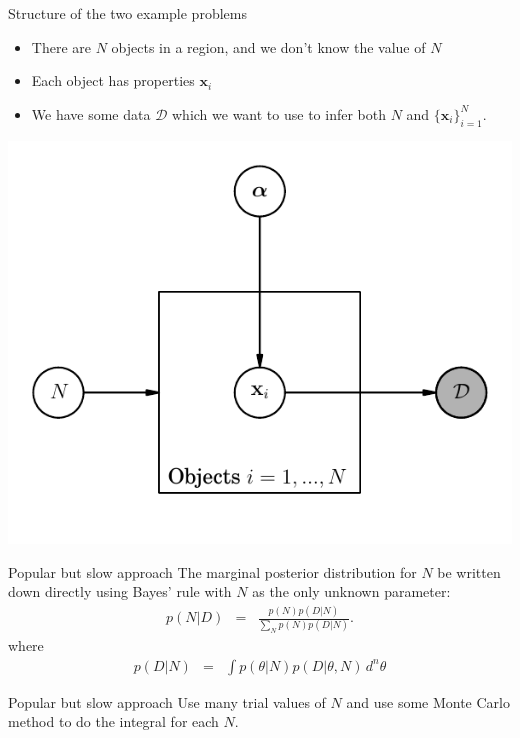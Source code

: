 \begin{frame}[t]{Structure of the two example problems}
  \begin{itemize}
  \setlength{\itemsep}{10pt}
  \item There are $N$ objects in a region, and we don't know the value of $N$
  \item Each object has properties $\mathbf{x}_i$
  \item We have some data $\mathcal{D}$ which we want to use to infer both $N$
        and $\{\mathbf{x}_i\}_{i=1}^N$.
  \end{itemize}
\begin{center}
\includegraphics[scale=0.5]{../Paper/pgm.pdf}
\end{center}
\end{frame}

\begin{frame}[t]{Popular but slow approach}
The marginal posterior distribution for $N$ be written down directly
using Bayes' rule with $N$ as the only unknown parameter:
\begin{eqnarray}
p(N | D) &=& \frac{p(N)p(D | N)}{\sum_N p(N)p(D | N)}.
\end{eqnarray}
where
\begin{eqnarray}
p(D | N) &=& \int p(\theta | N) p(D | \theta, N) \, d^n \theta
\end{eqnarray}
\end{frame}

\begin{frame}[t]{Popular but slow approach}
Use many trial values of $N$ and use some Monte Carlo method to do the integral
for each $N$.
\end{frame}


